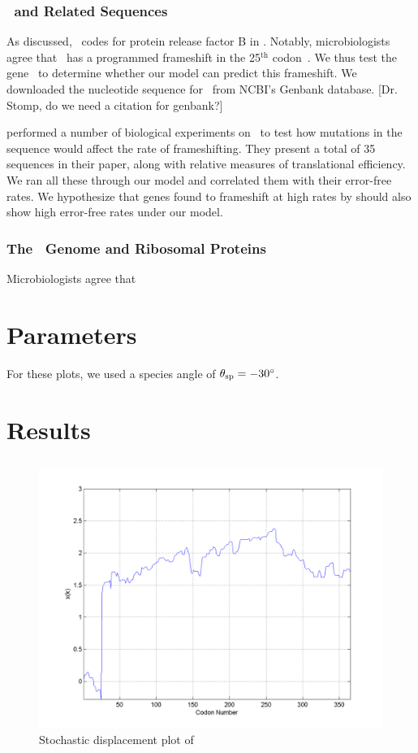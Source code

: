 \documentclass[12pt, draft]{article}
\numberwithin{equation}{section}
\begin{document}
\subsubsection{\prfB\ and Related Sequences}
As discussed, \prfB\ codes for protein release factor B in \ecoli.
Notably, microbiologists agree that \prfB\ has a programmed frameshift
in the 25$^\textrm{th}$ codon~\cite{weiss87}.  We thus test the
gene \prfB\ to determine whether our model can predict this
frameshift.  We downloaded the nucleotide sequence for \prfB\ from
NCBI's Genbank database.  [Dr. Stomp, do we need a citation for genbank?]

\citet{weiss87} performed a number of biological experiments on
\prfB\ to test how mutations in the sequence would affect the rate of
frameshifting.  They present a total of 35 sequences in their paper,
along with relative measures of translational efficiency.  We ran all
these through our model and correlated them with their error-free rates.
We hypothesize that genes found to frameshift at high rates by
\citeauthor{weiss87} should also show high error-free rates under
our model.

\subsubsection{The \ecoli\ Genome and Ribosomal Proteins}
Microbiologists agree that 


\section{Parameters}
For these plots, we used a species angle of $\theta_{\rm{sp}}
=-30^\circ$.

\section{Results}
\subsection{\prfB}

\begin{figure}
  \centering
  \caption{Stochastic displacement plot of \prfB}
  \label{prfB}
  \includegraphics[scale=0.4]{prfB/disp}
\end{figure}
\end{document}

